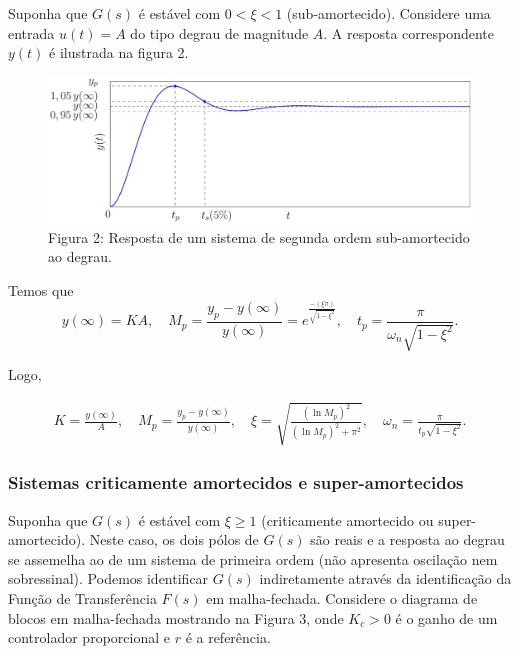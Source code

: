 \documentclass[
]{book}
\begin{document}
Suponha que \(G(s)\) é estável com \(0 < \xi < 1\) (sub-amortecido). Considere uma entrada \(u(t) = A\) do tipo degrau de magnitude \(A\). A resposta correspondente \(y(t)\) é ilustrada na figura 2.

\begin{figure}
\centering
\includegraphics{Imagens/Lab3/Explicação/fig2.jpg}
\caption{Figura 2: Resposta de um sistema de segunda ordem sub-amortecido ao degrau.}
\end{figure}

Temos que
\[
y(\infty) = KA, \quad M_p= \frac {y_p-y(\infty)}{y(\infty)} = e^{\frac {-(\xi \pi)}{\sqrt{1-\xi^2}}}, \quad
t_p = \frac {\pi}{\omega_n\sqrt{1-\xi^2}}.
\]

Logo,

\begin{align}
K = \frac {y(\infty)}{A}, \quad M_p = \frac {y_p - y(\infty)}{y(\infty)}, \quad \xi = \sqrt{\frac {(\ln{M_p})^2}{(\ln{M_p})^2+\pi^2}}, \quad \omega_n = \frac {\pi}{t_p\sqrt{1-\xi^2}}.  \label{eq:eq34}
\end{align}

\hypertarget{sistemas-criticamente-amortecidos-e-super-amortecidos}{%
\subsubsection*{Sistemas criticamente amortecidos e super-amortecidos}\label{sistemas-criticamente-amortecidos-e-super-amortecidos}}

Suponha que \(G(s)\) é estável com \(\xi \geq 1\) (criticamente amortecido ou super-amortecido). Neste caso, os dois pólos de \(G(s)\) são reais e a resposta ao degrau se assemelha ao de um sistema de primeira ordem (não apresenta oscilação nem sobressinal). Podemos identificar \(G(s)\) indiretamente através da identificação da Função de Transferência \(F(s)\) em malha-fechada. Considere o diagrama de blocos em malha-fechada mostrando na Figura 3, onde \(K_c > 0\) é o ganho de um controlador proporcional e \(r\) é a referência.
\end{document}
